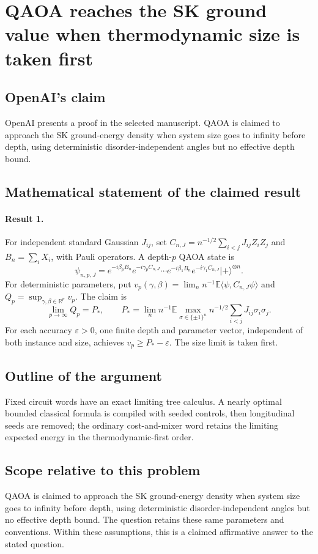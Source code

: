 \documentclass[11pt]{article}
\begin{document}
\section*{QAOA reaches the SK ground value when thermodynamic size is taken first}

\subsection{OpenAI's claim}
OpenAI presents a proof in the selected manuscript. QAOA is claimed to approach the SK ground-energy density when system size goes to infinity before depth, using deterministic disorder-independent angles but no effective depth bound.

\subsection{Mathematical statement of the claimed result}
\paragraph{Result 1.} For independent standard Gaussian \(J_{ij}\), set \(C_{n,J}=n^{-1/2}\sum_{i<j}J_{ij}Z_iZ_j\) and \(B_n=\sum_iX_i\), with Pauli operators. A depth-\(p\) QAOA state is
\[
 \psi_{n,p,J}=e^{-i\beta_pB_n}e^{-i\gamma_pC_{n,J}}\cdots
 e^{-i\beta_1B_n}e^{-i\gamma_1C_{n,J}}|+\rangle^{\otimes n}.
\]
For deterministic parameters, put \(v_p(\gamma,\beta)=\lim_n n^{-1}\mathbb E\langle\psi,C_{n,J}\psi\rangle\) and \(Q_p=\sup_{\gamma,\beta\in\mathbb R^p}v_p\). The claim is
\[
 \lim_{p\to\infty}Q_p=P_*,\qquad
 P_*=\lim_n n^{-1}\mathbb E\max_{\sigma\in\{\pm1\}^n}
 n^{-1/2}\sum_{i<j}J_{ij}\sigma_i\sigma_j.
\]
For each accuracy \(\varepsilon>0\), one finite depth and parameter vector, independent of both instance and size, achieves \(v_p\ge P_*-\varepsilon\). The size limit is taken first.

\subsection{Outline of the argument}
Fixed circuit words have an exact limiting tree calculus. A nearly optimal bounded classical formula is compiled with seeded controls, then longitudinal seeds are removed; the ordinary cost-and-mixer word retains the limiting expected energy in the thermodynamic-first order.

\subsection{Scope relative to this problem}
QAOA is claimed to approach the SK ground-energy density when system size goes to infinity before depth, using deterministic disorder-independent angles but no effective depth bound. The question retains these same parameters and conventions. Within these assumptions, this is a claimed affirmative answer to the stated question.
\end{document}
